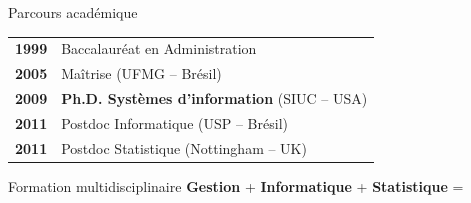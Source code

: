 \documentclass[aspectratio=169,11pt]{beamer}
\begin{document}
\begin{frame}{Parcours académique}
  \small
  \begin{center}
    \begin{tabular}{c|l}
      \textcolor{ushervert}{\textbf{1999}} & Baccalauréat en Administration \\
      \textcolor{ushervert}{\textbf{2005}} & Maîtrise (UFMG -- Brésil) \\
      \textcolor{ushervert}{\textbf{2009}} & \textbf{Ph.D. Systèmes d'information} (SIUC -- USA) \\
      \textcolor{ushervert}{\textbf{2011}} & Postdoc Informatique (USP -- Brésil) \\
      \textcolor{ushervert}{\textbf{2011}} & Postdoc Statistique (Nottingham -- UK) \\
    \end{tabular}
  \end{center}
  
  \vspace{0.5em}
  \begin{block}{Formation multidisciplinaire}
    \centering
    \textbf{Gestion} + \textbf{Informatique} + \textbf{Statistique} = 
  \end{block}
\end{frame}
\end{document}
